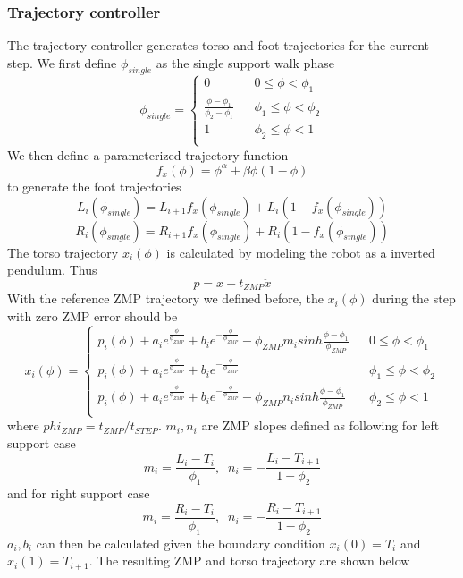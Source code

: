 \documentclass{article}
\begin{document}
\subsubsection{Trajectory controller}
	The trajectory controller generates torso and foot trajectories for the current step. We first define $\phi_{single}$ as the single support walk phase
$$ \phi_{single}=\left\{
\begin{array}{rcl}
0 & & 0 \leq \phi < \phi_1\\
\frac{\phi-\phi_1}{\phi_2-\phi_1} & & \phi_1 \leq \phi < \phi_2\\
1 & & \phi_2 \leq \phi < 1\\
\end{array} \right. $$
We then define a parameterized trajectory function
$$f_x(\phi)=\phi^{\alpha}+\beta \phi(1-\phi)$$
to generate the foot trajectories
$$L_i(\phi_{single})=L_{i+1}f_x(\phi_{single})+L_i(1-f_x(\phi_{single}))$$
$$R_i(\phi_{single})=R_{i+1}f_x(\phi_{single})+R_i(1-f_x(\phi_{single}))$$
The torso trajectory $x_i(\phi)$ is calculated by modeling the robot as a inverted pendulum. Thus
$$p=x-t_{ZMP}\ddot x$$
With the reference ZMP trajectory we defined before, the $x_i(\phi)$ during the step with zero ZMP error should be
$$ x_i(\phi)=\left\{
\begin{array}{rcl}
p_i(\phi)+a_i e^{\frac{\phi}{\phi_{ZMP}}}+b_i e^{-\frac{\phi}{\phi_{ZMP}}}-\phi_{ZMP}m_i sinh \frac{\phi-\phi_1}{\phi_{ZMP}}& & 0 \leq \phi < \phi_1\\
p_i(\phi)+a_i e^{\frac{\phi}{\phi_{ZMP}}}+b_i e^{-\frac{\phi}{\phi_{ZMP}}} & & \phi_1 \leq \phi < \phi_2\\
p_i(\phi)+a_i e^{\frac{\phi}{\phi_{ZMP}}}+b_i e^{-\frac{\phi}{\phi_{ZMP}}}-\phi_{ZMP}n_i sinh \frac{\phi-\phi_1}{\phi_{ZMP}} & & \phi_2 \leq \phi < 1\\
\end{array} \right. $$
where $phi_{ZMP}=t_{ZMP}/t_{STEP}$. $m_i,n_i$ are ZMP slopes defined as following for left support case
$$m_i=\frac{L_i-T_i}{\phi_1},\;\;n_i=-\frac{L_i-T_{i+1}}{1-\phi_2}$$
and for right support case
$$m_i=\frac{R_i-T_i}{\phi_1},\;\;n_i=-\frac{R_i-T_{i+1}}{1-\phi_2}$$
$a_i,b_i$ can then be calculated given the boundary condition $x_i(0)=T_i$ and $x_i(1)=T_{i+1}$. The resulting ZMP and torso trajectory are shown below
\end{document}
